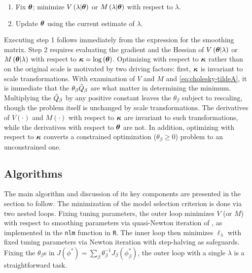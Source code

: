 \begin{enumerate}
\item Fix $\mbox{\boldmath $\theta$}$; minimize $V\left(\lambda \vert \mbox{\boldmath $\theta$}\right)$ or $M\left(\lambda \vert \mbox{\boldmath $\theta$}\right)$ with respect to $\lambda$.
\item Update $\mbox{\boldmath $\theta$}$ using the current estimate of $\lambda$.
\end{enumerate}
\noindent
Executing step 1 follows immediately from the expression for the smoothing matrix. Step 2 requires evaluating the gradient and the Hessian of $V\left( \mbox{\boldmath $\theta$} \vert \lambda \right)$ or $M\left(\mbox{\boldmath $\theta$} \vert \lambda\right)$ with respect to $\mbox{\boldmath $\kappa$} = \log\left(\mbox{\boldmath $\theta$}\right)$. Optimizing with respect to $\mbox{\boldmath $\kappa$}$ rather than on the original scale is motivated by two driving factors: first, $\mbox{\boldmath $\kappa$}$ is invariant to scale transformations. With examination of $V$ and $M$ and \ref{eq:cholesky-tildeA}, it is immediate that the $\theta_\beta \tilde{Q}_\beta$ are what matter in determining the minimum. Multiplying the $\tilde{Q}_\beta$ by any positive constant leaves the $\theta_\beta$ subject to rescaling, though the problem itself is unchanged by scale transformations. The derivatives of $V\left(\cdot\right)$ and $M\left(\cdot\right)$ with respect to $\mbox{\boldmath $\kappa$}$ are invariant to such transformations, while the derivatives with respect to $\mbox{\boldmath $\theta$}$ are not. In addition, optimizing with respect to $\mbox{\boldmath $\kappa$}$ converts a constrained optimization ($\theta_\beta \ge 0$) problem to an unconstrained one.

\subsection{Algorithms}

The main algorithm and discussion of its key components are presented in the section to follow. The minimization of the model selection criterion is done via two nested loops. Fixing tuning parameters, the outer loop minimizes $V$ (or $M$) with respect to smoothing parameters via quasi-Newton iteration of \citet{dennis1996numerical}, as implemented in the \texttt{nlm} function in \texttt{R}. The inner loop then minimizes $\ell_\lambda$ with fixed tuning parameters via Newton iteration with step-halving as safeguards. Fixing the $\theta_\beta$s in $J \left(\phi^*\right) = \sum_\beta \theta^{-1}_\beta J_\beta \left(\phi_\beta^*\right)$, the outer loop with a single $\lambda$ is a straightforward task. 




